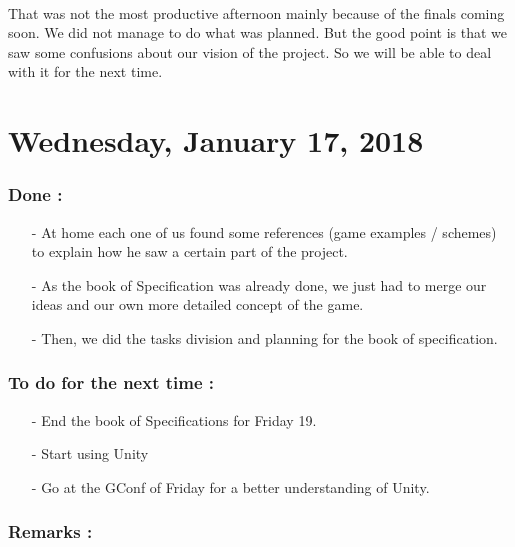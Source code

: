 \documentclass[12pt]{article}
\begin{document}
		\paragraph{} That was not the most productive afternoon mainly because of the finals coming soon. We did not manage to do what was planned. But the good point is that we saw some confusions about our vision of the project. So we will be able to deal with it for the next time.
\newpage


\section*{Wednesday, January 17, 2018}
	\subsubsection*{Done :}
      \begin{itemize}
        \item[-] At home each one of us found some references (game examples / schemes) to explain how he saw a certain part of the project.
        \item[-] As the book of Specification was already done, we just had to merge our ideas and our own more detailed concept of the game.
        \item[-] Then, we did the tasks division and planning for the book of specification.
      \end{itemize}
    
    \subsubsection*{To do for the next time :}
      \begin{itemize}
        \item[-] End the book of Specifications for Friday 19.
        \item[-] Start using Unity
        \item[-] Go at the GConf of Friday for a better understanding of Unity.
      \end{itemize}
    
	\subsubsection*{Remarks :}
\end{document}
